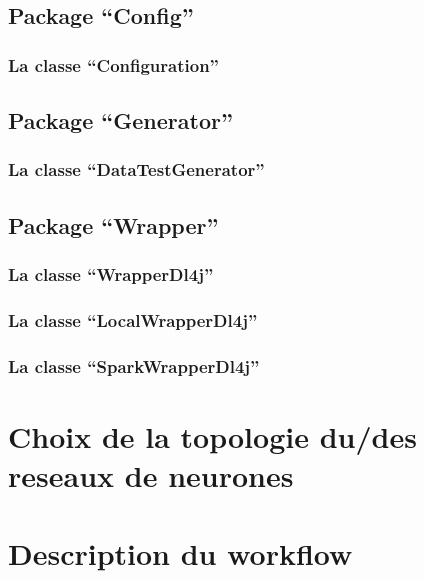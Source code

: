 \documentclass[a4paper,10pt,openany,oneside]{sphinxmanual}
\begin{document}
\subsection{Package ``Config''}
\label{index:package-config}

\subsubsection{La classe ``Configuration''}
\label{index:la-classe-configuration}

\subsection{Package ``Generator''}
\label{index:package-generator}

\subsubsection{La classe ``DataTestGenerator''}
\label{index:la-classe-datatestgenerator}

\subsection{Package ``Wrapper''}
\label{index:package-wrapper}

\subsubsection{La classe ``WrapperDl4j''}
\label{index:la-classe-wrapperdl4j}

\subsubsection{La classe ``LocalWrapperDl4j''}
\label{index:la-classe-localwrapperdl4j}

\subsubsection{La classe ``SparkWrapperDl4j''}
\label{index:la-classe-sparkwrapperdl4j}

\section{Choix de la topologie du/des reseaux de neurones}
\label{index:choix-de-la-topologie-du-des-reseaux-de-neurones}

\section{Description du workflow}
\label{index:description-du-workflow}
\end{document}
